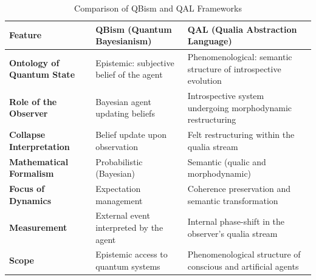 \documentclass[11pt]{article}
\numberwithin{equation}{section} %
\begin{document}
\begin{table}[H]
\centering
\renewcommand{\arraystretch}{1.4}
\begin{tabular}{|p{}|p{}|p{}|}
\hline
\textbf{Feature} & \textbf{QBism (Quantum Bayesianism)} & \textbf{QAL (Qualia Abstraction Language)} \\
\hline
\textbf{Ontology of Quantum State} & Epistemic: subjective belief of the agent & Phenomenological: semantic structure of introspective evolution \\
\hline
\textbf{Role of the Observer} & Bayesian agent updating beliefs & Introspective system undergoing morphodynamic restructuring \\
\hline
\textbf{Collapse Interpretation} & Belief update upon observation & Felt restructuring within the qualia stream \\
\hline
\textbf{Mathematical Formalism} & Probabilistic (Bayesian) & Semantic (qualic and morphodynamic) \\
\hline
\textbf{Focus of Dynamics} & Expectation management & Coherence preservation and semantic transformation \\
\hline
\textbf{Measurement} & External event interpreted by the agent & Internal phase-shift in the observer’s qualia stream \\
\hline
\textbf{Scope} & Epistemic access to quantum systems & Phenomenological structure of conscious and artificial agents \\
\hline
\end{tabular}
\caption{Comparison of QBism and QAL Frameworks}
\label{tab:qbism-qal-comparison}
\end{table}
\end{document}
